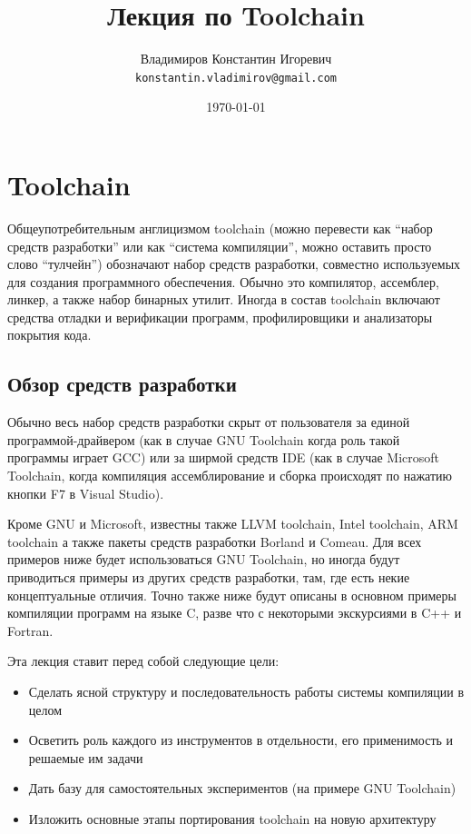 \documentclass[a4paper,12pt,oneside]{article}
\title{Лекция по Toolchain}
\author{
  Владимиров Константин Игоревич\\
  \texttt{konstantin.vladimirov@gmail.com}
}
\date{\today}
\begin{document}
\tableofcontents

\pagebreak
\section{Toolchain}\label{Toolchain}

Общеупотребительным англицизмом toolchain (можно перевести как ``набор средств разработки'' или как ``система компиляции'', можно оставить просто слово ``тулчейн'') обозначают набор средств разработки, совместно используемых для создания программного обеспечения. Обычно это компилятор, ассемблер, линкер, а также набор бинарных утилит. Иногда в состав toolchain включают средства отладки и верификации программ, профилировщики и анализаторы покрытия кода.

\subsection{Обзор средств разработки}\label{Overview}

Обычно весь набор средств разработки скрыт от пользователя за единой программой-драйвером (как в случае GNU Toolchain когда роль такой программы играет GCC) или за ширмой средств IDE (как в случае Microsoft Toolchain, когда компиляция ассемблирование и сборка происходят по нажатию кнопки F7 в Visual Studio).

Кроме GNU и Microsoft, известны также LLVM toolchain, Intel toolchain, ARM toolchain а также пакеты средств разработки Borland и Comeau. Для всех примеров ниже будет использоваться GNU Toolchain, но иногда будут приводиться примеры из других средств разработки, там, где есть некие концептуальные отличия. Точно также ниже будут описаны в основном примеры компиляции программ на языке C, разве что с некоторыми экскурсиями в C++ и Fortran.

Эта лекция ставит перед собой следующие цели:

\begin{itemize}
\item Сделать ясной структуру и последовательность работы системы компиляции в целом
\item Осветить роль каждого из инструментов в отдельности, его применимость и решаемые им задачи
\item Дать базу для самостоятельных экспериментов (на примере GNU Toolchain)
\item Изложить основные этапы портирования toolchain на новую архитектуру
\end{itemize}
\end{document}

